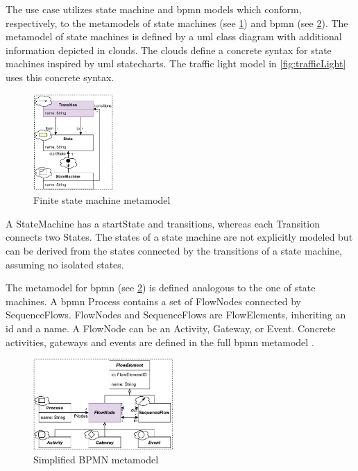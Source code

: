 \documentclass{jot}
\begin{document}
The use case utilizes state machine and \gls*{bpmn} models which conform, respectively, to the metamodels of state machines (see \cref{fig:fsm_metamodel}) and \gls*{bpmn} (see \cref{fig:bpmn_metamodel}).
The metamodel of state machines is defined by a \gls*{uml} class diagram with additional information depicted in clouds.
The clouds define a concrete syntax for state machines inspired by \gls*{uml} statecharts.
The traffic light model in \cref{fig:trafficLight} uses this concrete syntax.

\begin{figure}[h]
    \centering
    \includegraphics[width=0.275\textwidth]{figures/state_machine_metamodel.pdf}
    \caption{Finite state machine metamodel}
    \label{fig:fsm_metamodel}
\end{figure}

A \textsf{StateMachine} has a \textsf{startState} and \textsf{transitions}, whereas each \textsf{Transition} connects two \textsf{State}s.
The states of a state machine are not explicitly modeled but can be derived from the states connected by the transitions of a state machine, assuming no isolated states.

The metamodel for \gls*{bpmn} (see \cref{fig:bpmn_metamodel}) is defined analogous to the one of state machines. 
A \gls*{bpmn} \textsf{Process} contains a set of \textsf{FlowNode}s connected by \textsf{SequenceFlow}s.
\textsf{FlowNode}s and \textsf{SequenceFlow}s are \textsf{FlowElement}s, inheriting an \textsf{id} and a \textsf{name}.
A \textsf{FlowNode} can be an \textsf{Activity}, \textsf{Gateway}, or \textsf{Event}.
Concrete activities, gateways and events are defined in the full \gls*{bpmn} metamodel \cite{objectmanagementgroupBusinessProcessModel2013}. %

\begin{figure}[h]
    \centering
    \includegraphics[width=0.475\textwidth]{figures/bpmn_metamodel.pdf}
    \caption{Simplified BPMN metamodel \cite{objectmanagementgroupBusinessProcessModel2013}}
    \label{fig:bpmn_metamodel}
\end{figure}
\end{document}

